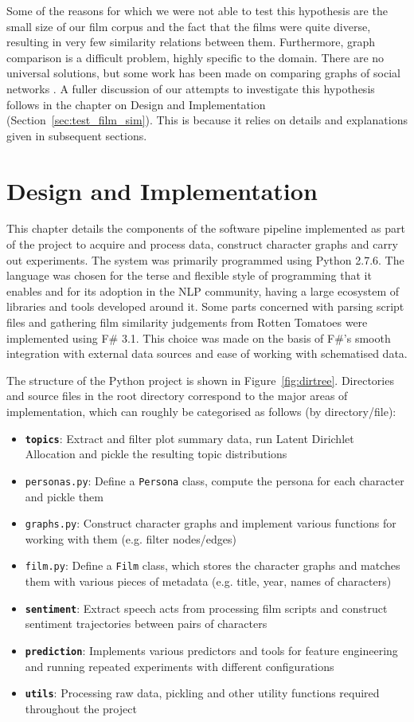 \documentclass[bsc,frontabs,singlespacing,parskip, twoside]{infthesis}
\begin{document}
Some of the reasons for which we were not able to test this hypothesis are the small size of our film corpus and the fact that the films were quite diverse, resulting in very few similarity relations between them. Furthermore, graph comparison is a difficult problem, highly specific to the domain. There are no universal solutions, but some work has been made on comparing graphs of social networks \cite{macindoe2010graph}. A fuller discussion of our attempts to investigate this hypothesis follows in the chapter on Design and Implementation (Section~\ref{sec:test_film_sim}). This is because it relies on details and explanations given in subsequent sections.

\chapter{Design and Implementation}

This chapter details the components of the software pipeline implemented as part of the project to acquire and process data, construct character graphs and carry out experiments. The system was primarily programmed using Python 2.7.6. The language was chosen for the terse and flexible style of programming that it enables and for its adoption in the NLP community, having a large ecosystem of libraries and tools developed around it. Some parts concerned with parsing script files and gathering film similarity judgements from Rotten Tomatoes were implemented using F\# 3.1. This choice was made on the basis of F\#'s smooth integration with external data sources and ease of working with schematised data.

The structure of the Python project is shown in Figure~\ref{fig:dirtree}. Directories and source files in the root directory correspond to the major areas of implementation, which can roughly be categorised as follows (by directory/file):
\begin{itemize}
	\item \texttt{\textbf{topics}}:  Extract and filter plot summary data, run Latent Dirichlet Allocation and pickle the resulting topic distributions
	\item \texttt{personas.py}: Define a \texttt{Persona} class, compute the persona for each character and pickle them
	\item \texttt{graphs.py}: Construct character graphs and implement various functions for working with them (e.g. filter nodes/edges)
	\item \texttt{film.py}: Define a \texttt{Film} class, which stores the character graphs and matches them with various pieces of metadata (e.g. title, year, names of characters)
	\item \texttt{\textbf{sentiment}}: Extract speech acts from processing film scripts and construct sentiment trajectories between pairs of characters
	\item \texttt{\textbf{prediction}}: Implements various predictors and tools for feature engineering and running repeated experiments with different configurations
	\item \texttt{\textbf{utils}}: Processing raw data, pickling and other utility functions required throughout the project
\end{itemize}
\end{document}
